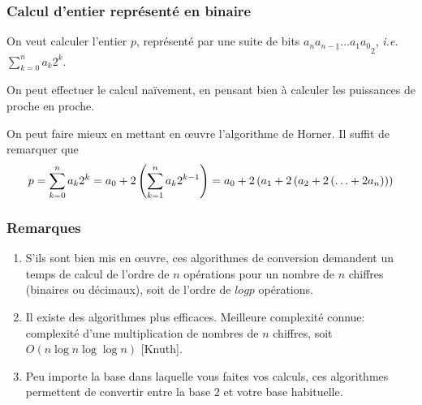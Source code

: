 \subsubsection{Calcul d'entier représenté en binaire}

On veut calculer l'entier $p$, représenté par une suite de bits
$\underline{a_{n}a_{n-1}\ldots a_{1}a_{0}}_{2}$, \emph{i.e.}
$\displaystyle\sum_{k=0}^{n}a_{k}2^{k}$.

On peut effectuer le calcul naïvement, en pensant bien à calculer les puissances de proche en proche. 
%

On peut faire mieux en mettant en {\oe}uvre l'algorithme de Horner. Il suffit de remarquer que 
\begin{equation*}
  p = \sum_{k=0}^{n}a_{k}2^{k} = a_0 + 2\left( \sum_{k=1}^{n}a_{k}2^{k-1}\right) = a_0 + 2\left( a_1+2\left( a_2 + 2\left( \ldots + 2a_n\right)\right)\right)
\end{equation*}

%    

\subsubsection{Remarques}
\begin{enumerate}
\item S'ils sont bien mis en œuvre, ces algorithmes de conversion demandent
un temps de calcul de l'ordre de $n$ opérations pour un nombre de $n$ chiffres
(binaires ou décimaux), soit de l'ordre de $log p$ opérations.
\item Il existe des algorithmes plus efficaces. Meilleure complexité
  connue: complexité d'une multiplication de nombres de $n$ chiffres,
  soit $O(n\log n \log \log n)$ [Knuth].
\item Peu importe la base dans laquelle vous faites vos calculs, ces
  algorithmes permettent de convertir entre la base $2$ et votre base
  habituelle. 
\end{enumerate}

